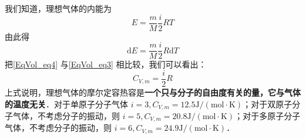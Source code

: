 我们知道，理想气体的内能为
\begin{equation}
E=\frac{m}{M} \frac{i}{2} R T
\end{equation}
由此得
\begin{equation} \label{EqVol_eq4}
\mathrm{d} E=\frac{m}{M} \frac{i}{2} R \mathrm{d} T
\end{equation}
把\autoref{EqVol_eq4} 与\autoref{EqVol_eq3} 相比较，我们可以看出：
\begin{equation}
C_{V, m}=\frac{i}{2} R
\end{equation}
上式说明，理想气体的摩尔定容热容是\textbf{一个只与分子的自由度有关的量，它与气体的温度无关}．对于单原子分子气体 $i=3, C_{V, m}=12.5 \mathrm{J} /(\mathrm{mol} \cdot \mathrm{K})$；对于双原子分子气体，不考虑分子的振动，则 $i=5, C_{V, {m}}=20.8 \mathrm{J} /(\mathrm{mol} \cdot \mathrm{K})$；对于多原子分子气体，不考虑分子的振动，则 $i=6, C_{V, {m}}=24.9 \mathrm{J} /(\mathrm{mol} \cdot \mathrm{K})$．
